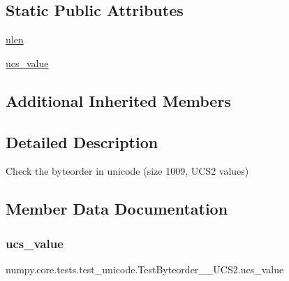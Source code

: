 \subsection*{Static Public Attributes}
\begin{DoxyCompactItemize}
\item 
\hyperlink{classnumpy_1_1core_1_1tests_1_1test__unicode_1_1TestByteorder__1009__UCS2_aa42fe88b2397a0a4c49c7e32f77cc1fe}{ulen}
\item 
\hyperlink{classnumpy_1_1core_1_1tests_1_1test__unicode_1_1TestByteorder__1009__UCS2_a71cb42392d2b8e53911c7c7ebf2d7b6d}{ucs\+\_\+value}
\end{DoxyCompactItemize}
\subsection*{Additional Inherited Members}


\subsection{Detailed Description}
\begin{DoxyVerb}Check the byteorder in unicode (size 1009, UCS2 values)\end{DoxyVerb}
 

\subsection{Member Data Documentation}
\mbox{\label{classnumpy_1_1core_1_1tests_1_1test__unicode_1_1TestByteorder__1009__UCS2_a71cb42392d2b8e53911c7c7ebf2d7b6d}} 
\subsubsection{\texorpdfstring{ucs\+\_\+value}{ucs\_value}}
{\footnotesize\ttfamily numpy.\+core.\+tests.\+test\+\_\+unicode.\+Test\+Byteorder\+\_\+\_\+\+U\+C\+S2.\+ucs\+\_\+value\hspace{0.3cm}{\ttfamily [static]}}

